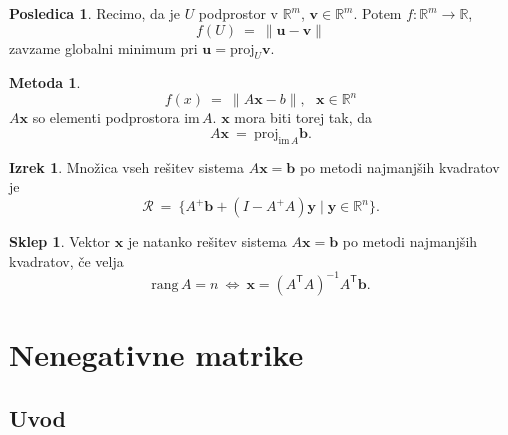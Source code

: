 \documentclass[11pt]{article}
\newcommand{\R}{\mathbb{R}}
\renewcommand{\b}{\mathbf{b}}
\newcommand{\x}{\mathbf{x}}
\newcommand{\y}{\mathbf{y}}
\renewcommand{\u}{\mathbf{u}}
\newcommand{\vv}{\mathbf{v}}
\newcommand{\0}{\mathbf{0}}
\newcommand{\rang}{\text{rang}\,}
\newcommand{\im}{\text{im}\,}
\newcommand{\RR}{\mathscr{R}}
\newcommand{\T}{\mathsf{T}}
\theoremstyle{definition}
\theoremstyle{definition}
\theoremstyle{definition}
\newtheorem{izrek}{Izrek}[section]
\theoremstyle{definition}
\newtheorem{metoda}{Metoda}[section]
\newtheorem*{posledica}{Posledica}
\newtheorem*{sklep}{Sklep}
\begin{document}
\begin{posledica}

Recimo, da je $U$ podprostor v $\R^m$, $\vv \in \R^m$. Potem $f: \R^m \rightarrow \R$, 
$$f(U) ~=~ \|\u - \vv\|$$
zavzame globalni minimum pri $\u = \text{proj}_U \vv$.

\end{posledica}
\vspace{0.5cm}

\begin{metoda}

$$f(x) ~=~ \|A\x-b\|, ~~~\x \in \R^n$$
$A\x$ so elementi podprostora $\im A$. $\x$ mora biti torej tak, da
$$A\x ~=~ \text{proj}_{\im A} \b.$$

\end{metoda}
\vspace{0.5cm}

\begin{izrek}

Množica vseh rešitev sistema $A\x = \b$ po metodi najmanjših kvadratov je
$$\RR ~=~ \{A^+ \b + (I - A^+ A)\y \mid \y \in \R^n\}.$$

\end{izrek}
\vspace{0.5cm}

\begin{sklep}

Vektor $\x$ je natanko rešitev sistema $A\x = \b$ po metodi najmanjših kvadratov, če velja
$$\rang A = n ~\iff~ \x = (A^\T A)^{-1} A^\T \b.$$

\end{sklep}
\vspace{0.5cm}


\pagebreak


\section{Nenegativne matrike}
\vspace{0.5cm}


\subsection{Uvod}
\vspace{0.5cm}
\end{document}
